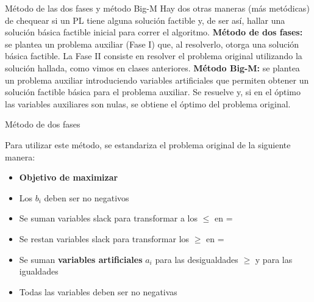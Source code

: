 \documentclass[10pt, aspectratio=169]{beamer}
\begin{document}
    \begin{frame}{Método de las dos fases y método Big-M}
        Hay dos otras maneras (más metódicas) de chequear si un PL tiene alguna solución factible y, de ser así, hallar
        una solución básica factible inicial para correr el algoritmo.
        \vskip 0.2cm
        \textbf{Método de dos fases:}
        se plantea un problema auxiliar (Fase I) que, al resolverlo, otorga una solución básica factible. La Fase II
        consiste en resolver el problema original utilizando la solución hallada, como vimos en clases anteriores.
        \vskip 0.2cm
        \textbf{Método Big-M:}
        se plantea un problema auxiliar introduciendo variables artificiales que permiten obtener un solución factible
        básica para el problema auxiliar. Se resuelve y, si en el óptimo las variables auxiliares son nulas, se obtiene
        el óptimo del problema original.

    \end{frame}

    \begin{frame}{Método de dos fases}

        \label{slide2}
        Para utilizar este método, se estandariza el problema original de la siguiente manera:
        \begin{itemize}
            \item \textbf{Objetivo de maximizar}
            \item Los $b_i$ deben ser no negativos
            \item Se suman variables slack para transformar a los $\leq$ en =
            \item Se restan variables slack para transformar los $\geq$ en =
            \item Se suman \textbf{variables artificiales} $a_i$ para las desigualdades $\geq$ y para las igualdades
            \item Todas las variables deben ser no negativas
        \end{itemize}
    \end{frame}
\end{document}
